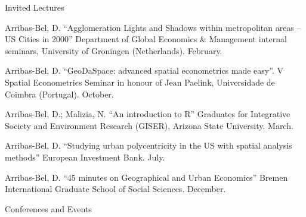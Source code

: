 \documentclass[12pt,2up]{article}
\begin{document}
\begin{cv}{}
\begin{cvlist}{Invited Lectures}
\item[] Arribas-Bel, D. ``Agglomeration Lights and Shadows within
    metropolitan areas -- US Cities in 2000'' Department of Global Economics \&
    Management internal seminars,
    University of Groningen (Netherlands). February.

\item[2012] Arribas-Bel, D. ``GeoDaSpace: advanced spatial econometrics made
    easy''. V Spatial Econometrics Seminar in honour of Jean Paelink,
    Universidade de Coimbra (Portugal). October.

\item[] Arribas-Bel, D.; Malizia, N. ``An introduction to R'' Graduates
    for Integrative Society and Environment Research (GISER), Arizona State
    University. March.

\item[2011] Arribas-Bel, D. ``Studying urban polycentricity in the US with
    spatial analysis methods'' European Investment Bank. July.

\item[2007] Arribas-Bel, D. ``45 minutes on Geographical and Urban Economics''
  Bremen International Graduate School of Social Sciences. December.

  \end{cvlist}

\begin{cvlist}{Conferences and Events}

\item[\textbf{Organization}]


\end{cvlist}
\end{cv}
\end{document}
